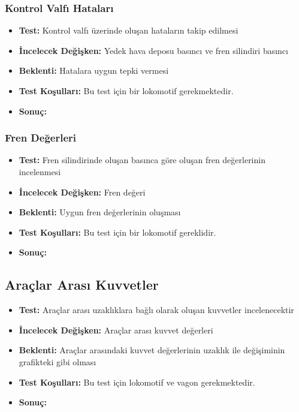 \documentclass[10pt,a4paper]{article}
\begin{document}
\subsubsection{Kontrol Valfı Hataları}
\begin{itemize}
\item \textbf{Test:} Kontrol valfı üzerinde oluşan hataların takip edilmesi\\
\item \textbf{İncelecek Değişken:} Yedek hava deposu basıncı ve fren silindiri basıncı\\
\item \textbf{Beklenti:} Hatalara uygun tepki vermesi\\
\item \textbf{Test Koşulları:} Bu test için bir lokomotif gerekmektedir.\\
\item \textbf{Sonuç:}
\end{itemize}


\subsubsection{Fren Değerleri}
\begin{itemize}
\item \textbf{Test:} Fren silindirinde oluşan basınca göre oluşan fren değerlerinin incelenmesi\\
\item \textbf{İncelecek Değişken:} Fren değeri\\
\item \textbf{Beklenti:} Uygun fren değerlerinin oluşması\\
\item \textbf{Test Koşulları:} Bu test için bir lokomotif gereklidir. \\
\item \textbf{Sonuç:}
\end{itemize}

\subsection{Araçlar Arası Kuvvetler}
\begin{itemize}
\item \textbf{Test:} Araçlar arası uzaklıklara bağlı olarak oluşan kuvvetler incelenecektir\\
\item \textbf{İncelecek Değişken:} Araçlar arası kuvvet değerleri\\
\item \textbf{Beklenti:} Araçlar arasındaki kuvvet değerlerinin uzaklık ile değişiminin grafikteki gibi olması\\
\item \textbf{Test Koşulları:} Bu test için lokomotif ve vagon gerekmektedir. \\
\item \textbf{Sonuç:}
\end{itemize}
\end{document}
